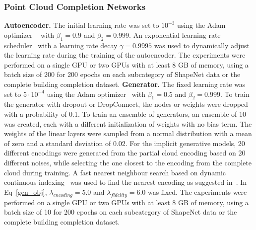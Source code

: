         \subsubsection{Point Cloud Completion Networks}
        \textbf{Autoencoder.}
        The initial learning rate was set to $10^{-3}$ using the Adam optimizer ~\cite{Adam} with $\beta_1 = 0.9$ and $\beta_2 = 0.999$. An exponential learning rate scheduler~\cite{ExpLR} with a learning rate decay $\gamma = 0.9995$ was used to dynamically adjust the learning rate during the training of the autoencoder. The experiments were performed on a single GPU or two GPUs with at least 8 GB of memory, using a batch size of 200 for 200 epochs on each subcategory of ShapeNet data or the complete building completion dataset. 
        \newline \textbf{Generator.}
        The fixed learning rate was set to $5\cdot10^{-4}$ using the Adam optimizer~\cite{Adam} with $\beta_1 = 0.5$ and $\beta_2 = 0.999$. To train the generator with dropout or DropConnect, the nodes or weights were dropped with a probability of 0.1. To train an ensemble of generators, an ensemble of 10 was created, each with a different initialization of weights with no bias term. The weights of the linear layers were sampled from a normal distribution with a mean of zero and a standard deviation of 0.02. For the implicit generative models, 20 different encodings were generated from the partial cloud encoding based on 20 different noises, while selecting the one closest to the encoding from the complete cloud during training. A fast nearest neighbour search based on dynamic continuous indexing~\cite{DCIkNN} was used to find the nearest encoding as suggested in~\cite{PCCIMLE}. In Eq~\ref{gen_obj}, $\lambda_{encoding} = 5.0$ and $\lambda_{fidelity} = 6.0$ was fixed. The experiments were performed on a single GPU or two GPUs with at least 8 GB of memory, using a batch size of 10 for 200 epochs on each subcategory of ShapeNet data or the complete building completion dataset.

